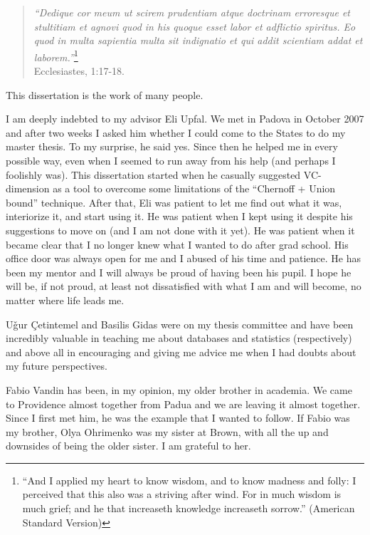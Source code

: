 \begin{quote}
\begin{flushright}
  {\em ``Dedique cor meum ut scirem prudentiam atque doctrinam erroresque et
  stultitiam et agnovi quod in his quoque esset labor et adflictio spiritus. Eo
  quod in multa sapientia multa sit indignatio et qui addit scientiam addat et
  laborem.''}\footnote{``And I applied my heart to know wisdom, and to know madness
  and folly: I perceived that this also was a striving after wind. For in much
  wisdom is much grief; and he that increaseth knowledge increaseth sorrow.'' 
  (American Standard Version)}\\Ecclesiastes, 1:17-18.
\end{flushright}
\end{quote}

This dissertation is the work of many people.

I am deeply indebted to my advisor Eli Upfal. We met in Padova in October 2007
and after two weeks I asked him whether I could come to the States to do my
master thesis. To my surprise, he said yes. Since then he helped me in every 
possible way, even when I seemed to run away from his help (and perhaps I
foolishly was). This dissertation started when he casually suggested
VC-dimension as a tool to overcome some limitations of the ``Chernoff + Union
bound'' technique. After that, Eli was patient to let me find out what it was,
interiorize it, and start using it. He was patient when I kept using it despite
his suggestions to move on (and I am not done with it yet). He was patient when
it became clear that I no longer knew what I wanted to do after grad school. His
office door was always open for me and I abused of his time and patience. He has
been my mentor and I will always be proud of having been his pupil. I hope he
will be, if not proud, at least not dissatisfied with what I am and will become,
no matter where life leads me.  

U\v{g}ur \c{C}etintemel and Basilis Gidas were on my thesis committee and have
been incredibly valuable in teaching me about databases and statistics
(respectively) and above all in encouraging and giving me advice me when I had
doubts about my future perspectives.

Fabio Vandin has been, in my opinion, my older brother in academia. We came to
Providence almost together from Padua and we are leaving it almost together.
Since I first met him, he was the example that I wanted to follow. If Fabio was
my brother, Olya Ohrimenko was my sister at Brown, with all the up and downsides
of being the older sister. I am grateful to her.

